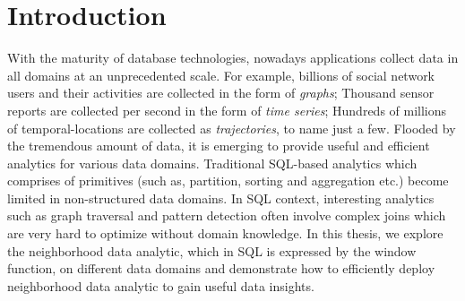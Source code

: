 \chapter{Introduction}
With the maturity of database technologies, nowadays
applications collect data in all domains at an
unprecedented scale. For example, billions of 
social network users and their activities are collected in the form
of \emph{graphs}; Thousand sensor reports are collected per second
in the form of \emph{time series}; Hundreds of millions of temporal-locations
are collected as \emph{trajectories}, to name just a few. Flooded by the
tremendous amount of data, it is emerging to 
provide useful and efficient analytics for various data domains.
Traditional SQL-based analytics which comprises 
of primitives (such as, partition, sorting and aggregation etc.)
become limited in non-structured data domains.
In SQL context, interesting analytics such as graph traversal and pattern detection
often involve complex joins which are very hard to optimize 
without domain knowledge.
In this thesis, we explore the neighborhood data analytic, which
in SQL is expressed by the window function,
on different data domains and demonstrate how to efficiently deploy
neighborhood data analytic to gain useful data insights.
%
%

